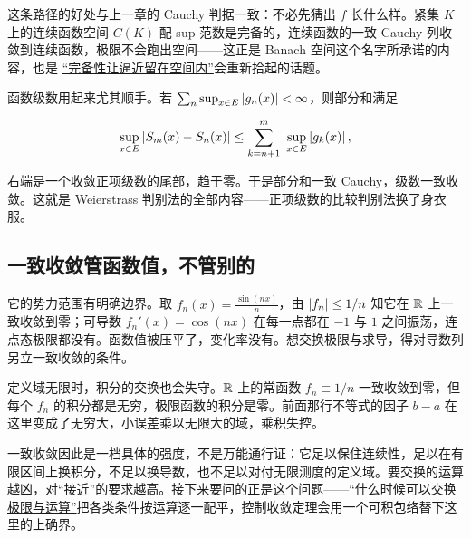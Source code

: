 这条路径的好处与上一章的 Cauchy 判据一致：不必先猜出 \(f\) 长什么样。紧集 \(K\) 上的连续函数空间 \(C(K)\) 配 sup 范数是完备的，连续函数的一致 Cauchy 列收敛到连续函数，极限不会跑出空间——这正是 Banach 空间这个名字所承诺的内容，也是 \hyperref[sec:12-Real-Analysis-Support/03-Topology-Basics/03]{``完备性让逼近留在空间内''}会重新拾起的话题。

函数级数用起来尤其顺手。若 \(\sum_n\sup_{x\in E}\left|g_n(x)\right|<\infty\)，则部分和满足

\[
\sup_{x\in E}\left|S_m(x)-S_n(x)\right| \le \sum_{k=n+1}^{m}\ \sup_{x\in E}\left|g_k(x)\right|,
\]

右端是一个收敛正项级数的尾部，趋于零。于是部分和一致 Cauchy，级数一致收敛。这就是 Weierstrass 判别法的全部内容——正项级数的比较判别法换了身衣服。

\subsection{一致收敛管函数值，不管别的}

它的势力范围有明确边界。取 \(f_n(x)=\frac{\sin(nx)}{n}\)，由 \(\left|f_n\right|\le1/n\) 知它在 \(\mathbb{R}\) 上一致收敛到零；可导数 \(f_n'(x)=\cos(nx)\) 在每一点都在 \(-1\) 与 \(1\) 之间振荡，连点态极限都没有。函数值被压平了，变化率没有。想交换极限与求导，得对导数列另立一致收敛的条件。

定义域无限时，积分的交换也会失守。\(\mathbb{R}\) 上的常函数 \(f_n\equiv 1/n\) 一致收敛到零，但每个 \(f_n\) 的积分都是无穷，极限函数的积分是零。前面那行不等式的因子 \(b-a\) 在这里变成了无穷大，小误差乘以无限大的域，乘积失控。

一致收敛因此是一档具体的强度，不是万能通行证：它足以保住连续性，足以在有限区间上换积分，不足以换导数，也不足以对付无限测度的定义域。要交换的运算越凶，对``接近''的要求越高。接下来要问的正是这个问题——\hyperref[ch:100]{``什么时候可以交换极限与运算''}把各类条件按运算逐一配平，控制收敛定理会用一个可积包络替下这里的上确界。
